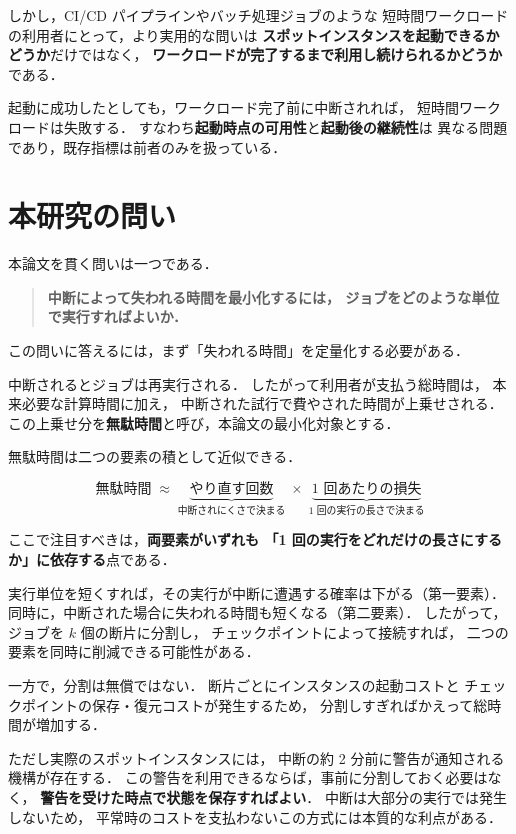 \documentclass[11pt,a4paper]{ltjsreport}
\begin{document}
しかし，CI/CD パイプラインやバッチ処理ジョブのような
短時間ワークロードの利用者にとって，より実用的な問いは
\textbf{スポットインスタンスを起動できるかどうか}だけではなく，
\textbf{ワークロードが完了するまで利用し続けられるかどうか}である．

起動に成功したとしても，ワークロード完了前に中断されれば，
短時間ワークロードは失敗する．
すなわち\textbf{起動時点の可用性}と\textbf{起動後の継続性}は
異なる問題であり，既存指標は前者のみを扱っている．

\section{本研究の問い}
\label{sec:question}

本論文を貫く問いは一つである．

\begin{quote}
\textbf{中断によって失われる時間を最小化するには，
ジョブをどのような単位で実行すればよいか．}
\end{quote}

この問いに答えるには，まず「失われる時間」を定量化する必要がある．

中断されるとジョブは再実行される．
したがって利用者が支払う総時間は，
本来必要な計算時間に加え，
中断された試行で費やされた時間が上乗せされる．
この上乗せ分を\textbf{無駄時間}と呼び，本論文の最小化対象とする．

無駄時間は二つの要素の積として近似できる．

\begin{equation}
\text{無駄時間} \;\approx\;
\underbrace{\text{やり直す回数}}_{\text{中断されにくさで決まる}}
\;\times\;
\underbrace{\text{1 回あたりの損失}}_{\text{1 回の実行の長さで決まる}}
\label{eq:intro_waste}
\end{equation}

ここで注目すべきは，\textbf{両要素がいずれも
「1 回の実行をどれだけの長さにするか」に依存する}点である．

実行単位を短くすれば，その実行が中断に遭遇する確率は下がる（第一要素）．
同時に，中断された場合に失われる時間も短くなる（第二要素）．
したがって，ジョブを $k$ 個の断片に分割し，
チェックポイントによって接続すれば，
二つの要素を同時に削減できる可能性がある．

一方で，分割は無償ではない．
断片ごとにインスタンスの起動コストと
チェックポイントの保存・復元コストが発生するため，
分割しすぎればかえって総時間が増加する．

ただし実際のスポットインスタンスには，
中断の約 2 分前に警告が通知される機構が存在する．
この警告を利用できるならば，事前に分割しておく必要はなく，
\textbf{警告を受けた時点で状態を保存すればよい}．
中断は大部分の実行では発生しないため，
平常時のコストを支払わないこの方式には本質的な利点がある．
\end{document}
